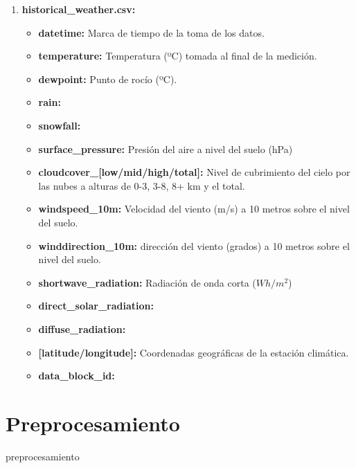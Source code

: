 \documentclass[a4paper,12pt]{article}
\begin{document}
\begin{enumerate}
    \item \textbf{historical\_weather.csv:}
    \begin{itemize}
        \item \textbf{datetime:} 
        Marca de tiempo de la toma de los datos.

        \item \textbf{temperature:} Temperatura 
        (ºC) tomada al final de la medición.

        \item \textbf{dewpoint:} 
        Punto de rocío (ºC).

        \item \textbf{rain:}

        \item \textbf{snowfall:}
        
        \item \textbf{surface\_pressure:} 
        Presión del aire a nivel del suelo (hPa)

        \item \textbf{cloudcover\_[low/mid/high/total]:}
        Nivel de cubrimiento del cielo por las nubes a
        alturas de 0-3, 3-8, 8+ km y el total. 

        \item \textbf{windspeed\_10m:} Velocidad del viento (m/s) 
        a 10 metros sobre el nivel del suelo.

        \item \textbf{winddirection\_10m:} dirección del viento
        (grados) a 10 metros sobre el nivel del suelo.

        \item \textbf{shortwave\_radiation:} 
        Radiación de onda corta ($Wh/m^{2}$)

        \item \textbf{direct\_solar\_radiation:}

        \item \textbf{diffuse\_radiation:}

        \item \textbf{[latitude/longitude]:} 
        Coordenadas geográficas de la estación climática.
        
        \item \textbf{data\_block\_id:}
    \end{itemize}

\end{enumerate}

\section{Preprocesamiento}
preprocesamiento
\end{document}
